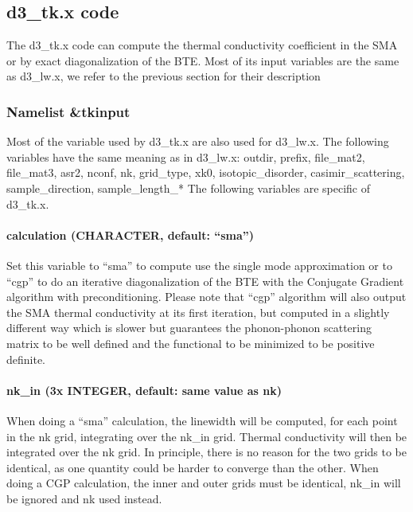 \documentclass[
]{article}
\begin{document}
\hypertarget{d3_tk.x-code}{%
\subsection{d3\_tk.x code}\label{d3_tk.x-code}}

The d3\_tk.x code can compute the thermal conductivity coefficient in
the SMA or by exact diagonalization of the BTE. Most of its input
variables are the same as d3\_lw.x, we refer to the previous section for
their description

\hypertarget{namelist-tkinput}{%
\subsubsection{Namelist \&tkinput}\label{namelist-tkinput}}

Most of the variable used by d3\_tk.x are also used for d3\_lw.x. The
following variables have the same meaning as in d3\_lw.x: outdir,
prefix, file\_mat2, file\_mat3, asr2, nconf, nk, grid\_type, xk0,
isotopic\_disorder, casimir\_scattering, sample\_direction,
sample\_length\_* The following variables are specific of d3\_tk.x.

\hypertarget{calculation-character-default-sma}{%
\paragraph{\texorpdfstring{calculation (CHARACTER, default:
\enquote{sma})}{calculation (CHARACTER, default: ``sma'')}}\label{calculation-character-default-sma}}

Set this variable to \enquote{sma} to compute use the single mode
approximation or to \enquote{cgp} to do an iterative diagonalization of
the BTE with the Conjugate Gradient algorithm with preconditioning.
Please note that \enquote{cgp} algorithm will also output the SMA
thermal conductivity at its first iteration, but computed in a slightly
different way which is slower but guarantees the phonon-phonon
scattering matrix to be well defined and the functional to be minimized
to be positive definite.

\hypertarget{nk_in-3x-integer-default-same-value-as-nk}{%
\paragraph{nk\_in (3x INTEGER, default: same value as
nk)}\label{nk_in-3x-integer-default-same-value-as-nk}}

When doing a \enquote{sma} calculation, the linewidth will be computed,
for each point in the nk grid, integrating over the nk\_in grid. Thermal
conductivity will then be integrated over the nk grid. In principle,
there is no reason for the two grids to be identical, as one quantity
could be harder to converge than the other. When doing a CGP
calculation, the inner and outer grids must be identical, nk\_in will be
ignored and nk used instead.
\end{document}
